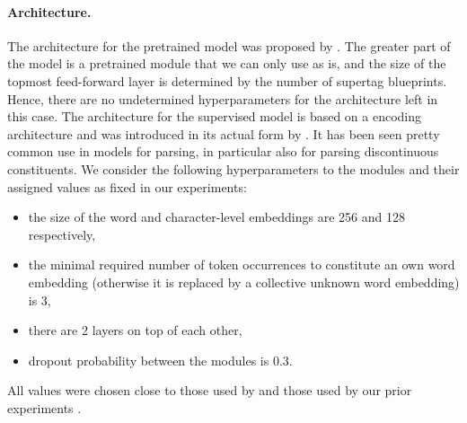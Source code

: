 \documentclass[../../document.tex]{subfiles}
\begin{document}
    \paragraph*{Architecture.}
    The architecture for the pretrained model was proposed by \citet{Devlin2019}.
    The greater part of the model is a pretrained module that we can only use as is, and the size of the topmost feed-forward layer is determined by the number of supertag blueprints.
    Hence, there are no undetermined hyperparameters for the architecture left in this case.
    The architecture for the supervised model is based on a  encoding architecture and was introduced in its actual form by \citet{kiperwasser2016simple}.
    It has been seen pretty common use in models for parsing, in particular also for parsing discontinuous constituents. \citep{kiperwasser2016simple,CoaCoh19,StaSte20,Cor20}
    We consider the following hyperparameters to the modules and their assigned values as fixed in our experiments:
    \begin{itemize}
        \item the size of the word and character-level embeddings are 256 and 128 respectively,
        \item the minimal required number of token occurrences to constitute an own word embedding (otherwise it is replaced by a collective unknown word embedding) is 3,
        \item there are 2  layers on top of each other,
        \item dropout probability between the modules is 0.3.
    \end{itemize}
    All values were chosen close to those used by \citet{Cor20} and those used by our prior experiments \citep{Rup22}.
\end{document}
